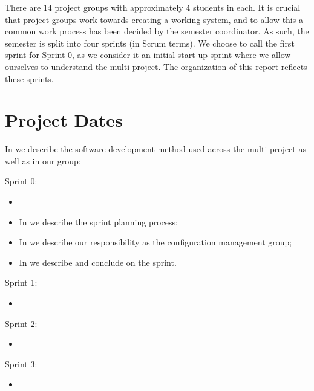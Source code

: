 There are 14 project groups with approximately 4 students in each. It is crucial that project groups work towards creating a working system, and to allow this a common work process has been decided by the semester coordinator. As such, the semester is split into four sprints (in Scrum terms). We choose to call the first sprint for Sprint 0, as we consider it an initial start-up sprint where we allow ourselves to understand the multi-project. 
The organization of this report reflects these sprints. 


\section{Project Dates}

\begin{documentorganization}
  \item In  we describe the software development method used across the multi-project as well as in our group;
  \item Sprint 0:
  \begin{itemize}
    \item {}
    \item In  we describe the sprint planning process;
    \item In  we describe our responsibility as the configuration management group;
    \item In  we describe and conclude on the sprint. 
  \end{itemize}
  \item Sprint 1:
  \begin{itemize}
    \item {}
  \end{itemize}
  \item Sprint 2:
  \begin{itemize}
    \item {}
  \end{itemize}
  \item Sprint 3:
  \begin{itemize}
    \item {}
  \end{itemize}
\end{documentorganization}